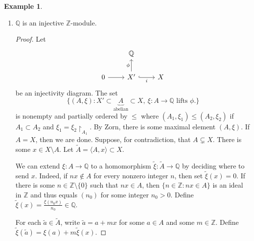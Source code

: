 \documentclass[10pt,letterpaper,cm]{nupset}
\theoremstyle{definition}
\newtheorem{exmp}[definition]{Example}
\theoremstyle{theorem}
\theoremstyle{remark}
\newcommand{\Q}{\mathbb Q}
\newcommand{\Z}{\mathbb Z}
\newcommand{\1}{\mathbf{1}}
\newcommand{\0}{\vec 0}
\begin{document}
\begin{exmp} $ $
\begin{enumerate}
\item $\Q$ is an injective $\Z$-module.
\begin{proof}
Let \[
\begin{tikzcd}
 & \Q &  \\
0 \arrow[r] & X' \arrow[r, "i"', hook] \arrow[u, "\phi"] & X
\end{tikzcd}
\] be an injectivity diagram. The set $$\{ (A, \xi) : X' \subset \underbrace{A}_{\text{abelian}} \subset X, \ \xi : A \to \Q \text{ lifts } \phi.  \}$$ is nonempty and partially ordered  by $\leq$ where $(A_1, \xi_1) \leq (A_2, \xi_2)$ if $A_1 \subset A_2$ and $\xi_1 = \xi_2\restriction_{A_1}$. By Zorn, there is some maximal element $(A, \xi)$. If $A = X$, then we are done. Suppose, for contradiction, that $A \subsetneq X$. There is some $x\in X \setminus A$. Let $\tilde{A} = \langle A, x\rangle \subset X$. 

We can extend $\xi : A \to \Q$ to a homomorphism $\tilde{\xi} : \tilde{A} \to \Q$ by deciding where to send $x$. Indeed, if $nx \notin A$ for every nonzero integer $n$, then set $\tilde{\xi}(x) = 0$. If there is some $n\in \Z \setminus \{0\}$ such that $nx \in A$, then $\{n \in \Z : nx \in A\}$ is an ideal in $\Z$ and thus equals $(n_0)$ for some integer $n_0 >0$. Define $\tilde{\xi}(x) = \frac{\xi(n_0x)}{n_0} \in \Q$. 

For each $\tilde{a} \in \tilde{A}$, write $\tilde{a} = a + mx$ for some $a\in A$ and some $m\in \Z$. Define $\tilde{\xi}(\tilde{a}) = \xi(a) + m\tilde{\xi}(x)$.


\end{proof}
\end{enumerate}
\end{exmp}
\end{document}
